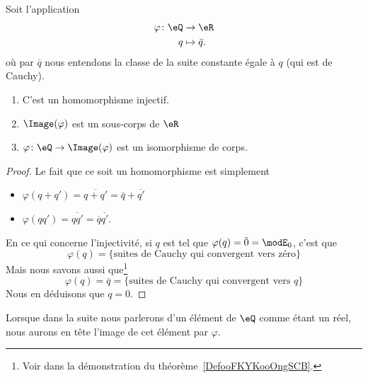 \begin{proposition}     \label{PropooEPFCooMtDOfP}
    Soit l'application
    \begin{equation}
        \begin{aligned}
            \varphi\colon \eQ&\to \eR \\
            q&\mapsto \bar q .
        \end{aligned}
    \end{equation}
    où par \( \bar q\) nous entendons la classe de la suite constante égale à \( q\) (qui est de Cauchy).
    \begin{enumerate}
        \item
            C'est un homomorphisme injectif.
        \item
            \( \Image(\varphi)\) est un sous-corps de \( \eR\)
        \item
            \( \varphi\colon \eQ\to \Image(\varphi)\) est un isomorphisme de corps.
    \end{enumerate}
\end{proposition}

\begin{proof}
    Le fait que ce soit un homomorphisme est simplement
    \begin{itemize}
        \item \( \varphi(q+q')=\overline{ q+q' }=\bar q+\overline{ q' }\)
        \item \( \varphi(qq')=\overline{ qq' }=\overline{ q }\overline{ q' }\).
    \end{itemize}
    En ce qui concerne l'injectivité, si \( q\) est tel que \( \varphi(q)=\bar 0=\modE_0\), c'est que
    \begin{equation}
        \varphi(q)=\{ \text{suites de Cauchy qui convergent vers zéro} \}
    \end{equation}
    Mais nous savons aussi que\footnote{Voir dans la démonstration du théorème~\ref{DefooFKYKooOngSCB}.}
    \begin{equation}
        \varphi(q)=\bar q=\{ \text{suites de Cauchy qui convergent vers } q \}
    \end{equation}
    Nous en déduisons que \( q=0\).
\end{proof}
Lorsque dans la suite nous parlerons d'un élément de \( \eQ\) comme étant un réel, nous aurons en tête l'image de cet élément par \( \varphi\).

